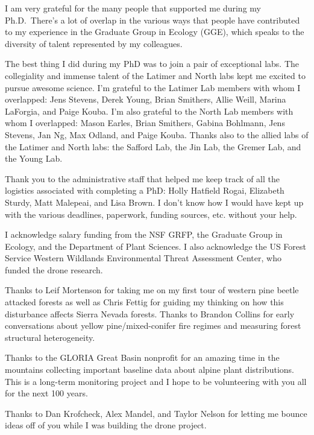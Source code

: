 \documentclass[twoside,12pt,final]{ucthesis-CA2012}
\begin{document}
\begin{ucfrontmatter}
\begin{acknowledgements}
    I am very grateful for the many people that supported me during my
    Ph.D.~There's a lot of overlap in the various ways that people have
    contributed to my experience in the Graduate Group in Ecology (GGE),
    which speaks to the diversity of talent represented by my colleagues.
    
    The best thing I did during my PhD was to join a pair of exceptional
    labs. The collegiality and immense talent of the Latimer and North labs
    kept me excited to pursue awesome science. I'm grateful to the Latimer
    Lab members with whom I overlapped: Jens Stevens, Derek Young, Brian
    Smithers, Allie Weill, Marina LaForgia, and Paige Kouba. I'm also
    grateful to the North Lab members with whom I overlapped: Mason Earles,
    Brian Smithers, Gabina Bohlmann, Jens Stevens, Jan Ng, Max Odland, and
    Paige Kouba. Thanks also to the allied labs of the Latimer and North
    labs: the Safford Lab, the Jin Lab, the Gremer Lab, and the Young Lab.
    
    Thank you to the administrative staff that helped me keep track of all
    the logistics associated with completing a PhD: Holly Hatfield Rogai,
    Elizabeth Sturdy, Matt Malepeai, and Lisa Brown. I don't know how I
    would have kept up with the various deadlines, paperwork, funding
    sources, etc. without your help.
    
    I acknowledge salary funding from the NSF GRFP, the Graduate Group in
    Ecology, and the Department of Plant Sciences. I also acknowledge the US
    Forest Service Western Wildlands Environmental Threat Assessment Center,
    who funded the drone research.
    
    Thanks to Leif Mortenson for taking me on my first tour of western pine
    beetle attacked forests as well as Chris Fettig for guiding my thinking
    on how this disturbance affects Sierra Nevada forests. Thanks to Brandon
    Collins for early conversations about yellow pine/mixed-conifer fire
    regimes and measuring forest structural heterogeneity.
    
    Thanks to the GLORIA Great Basin nonprofit for an amazing time in the
    mountains collecting important baseline data about alpine plant
    distributions. This is a long-term monitoring project and I hope to be
    volunteering with you all for the next 100 years.
    
    Thanks to Dan Krofcheck, Alex Mandel, and Taylor Nelson for letting me
    bounce ideas off of you while I was building the drone project.
    

\end{acknowledgements}
\end{ucfrontmatter}
\end{document}
